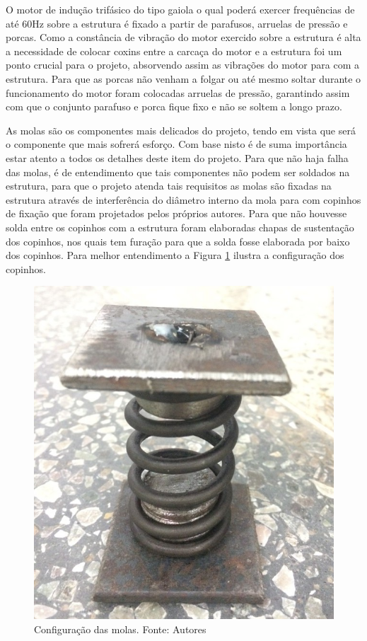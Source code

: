 
    O motor de indução trifásico do tipo gaiola o qual poderá exercer frequências de até 60Hz sobre a estrutura é fixado a partir de parafusos, arruelas de pressão e porcas. Como a constância de vibração do motor exercido sobre a estrutura é alta a necessidade de colocar coxins entre a carcaça do motor e a estrutura foi um ponto crucial para o projeto, absorvendo assim as vibrações do motor para com a estrutura. Para que as porcas não venham a folgar ou até mesmo soltar durante o funcionamento do motor foram colocadas arruelas de pressão, garantindo assim com que o conjunto parafuso e porca fique fixo e não se soltem a longo prazo.


    As molas são os componentes mais delicados do projeto, tendo em vista que será o componente que mais sofrerá esforço. Com base nisto é de suma importância estar atento a todos os detalhes deste item do projeto. Para que não haja falha das molas, é de entendimento que tais componentes não podem ser soldados na estrutura, para que o projeto atenda tais requisitos as molas são fixadas na estrutura através de interferência do diâmetro interno da mola para com copinhos de fixação que foram projetados pelos próprios autores. Para que não houvesse solda entre os copinhos com a estrutura foram elaboradas chapas de sustentação dos copinhos, nos quais tem furação para que a solda fosse elaborada por baixo dos copinhos. 
    Para melhor entendimento a Figura \ref{fig:config_copinhos} ilustra a configuração dos copinhos.

\begin{figure}[H]
\centering
\includegraphics[scale=0.5]{figuras/config_copinhos.png}
\caption{Configuração das molas. Fonte: Autores}
\label{fig:config_copinhos}
\end{figure}

